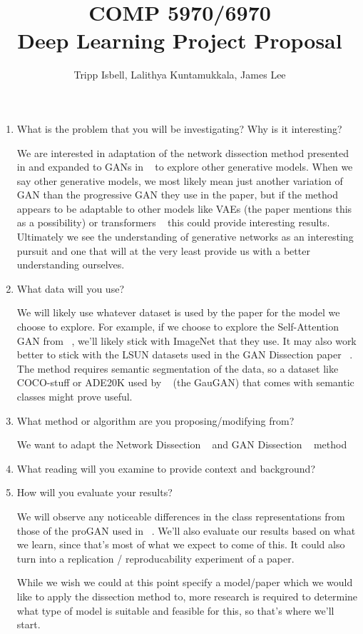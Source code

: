 \documentclass[notitlepage, 11pt]{article}
\title{COMP 5970/6970\\
Deep Learning Project Proposal}
\author{Tripp Isbell, Lalithya Kuntamukkala, James Lee}
\date{}
\begin{document}
\maketitle

\begin{enumerate}
\item What is the problem that you will be investigating? Why is it interesting?

We are interested in adaptation of the network dissection method presented ~\cite{netdissect2017} in and expanded to GANs in ~\cite{bau2019gandissect} to explore other generative models. When we say other generative models, we most likely mean just another variation of GAN than the progressive GAN they use in the paper, but if the method appears to be adaptable to other models like VAEs (the paper mentions this as a possibility) or transformers ~\cite{DBLP:journals/corr/abs-1904-10509} this could provide interesting results. Ultimately we see the understanding of generative networks as an interesting pursuit and one that will at the very least provide us with a better understanding ourselves.

\item What data will you use?

We will likely use whatever dataset is used by the paper for the model we choose to explore. For example, if we choose to explore the Self-Attention GAN from ~\cite{pmlr-v97-zhang19d}, we'll likely stick with ImageNet that they use. It may also work better to stick with the LSUN datasets used in the GAN Dissection paper ~\cite{bau2019gandissect}. The method requires semantic segmentation of the data, so a dataset like COCO-stuff or ADE20K used by ~\cite{DBLP:journals/corr/abs-1903-07291} (the GauGAN) that comes with semantic classes might prove useful.

\item What method or algorithm are you proposing/modifying from?

We want to adapt the Network Dissection ~\cite{netdissect2017} and GAN Dissection ~\cite{bau2019gandissect} method

\item What reading will you examine to provide context and background?
\begingroup
\renewcommand{\section}[2]{}%

\endgroup

\item How will you evaluate your results?

We will observe any noticeable differences in the class representations from those of the proGAN used in ~\cite{bau2019gandissect}. We'll also evaluate our results based on what we learn, since that's most of what we expect to come of this. It could also turn into a replication / reproducability experiment of a paper.

While we wish we could at this point specify a model/paper which we would like to apply the dissection method to, more research is required to determine what type of model is suitable and feasible for this, so that's where we'll start.
\end{enumerate}
\end{document}

